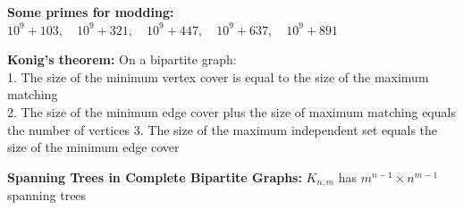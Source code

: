 \documentclass[a4paper,twocolumn]{article}
\newcommand\disappearingrule{%
	\par %
	\vskip5pt %
	\leaders\vrule width 0.4934\textwidth\vskip0.4pt %
	\nointerlineskip %
	\vskip2pt %
}
\begin{document}
{\textbf{Some primes for modding: } $10^9 + 103,\quad 10^9 + 321,\quad 10^9 + 447,\quad 10^9 + 637,\quad 10^9 + 891$

\disappearingrule

\textbf{Konig's theorem: } \textnormal{On a bipartite graph:}\\
\textnormal{1. The size of the minimum vertex cover is equal to the size of the maximum matching}\\
\textnormal{2. The size of the minimum edge cover plus the size of maximum matching equals the number of vertices}
\textnormal{3. The size of the maximum independent set equals the size of the minimum edge cover}

\textbf{Spanning Trees in Complete Bipartite Graphs: } \textnormal{$K_{n,m}$ has $m^{n-1} \times n^{m-1}$ spanning trees}
}
\end{document}
